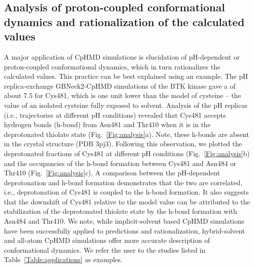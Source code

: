 \subsection{Analysis of proton-coupled conformational dynamics and rationalization of the calculated {\pka} values}
A major application of 
CpHMD simulations is 
elucidation of pH-dependent or proton-coupled conformational dynamics, which 
in turn rationalizes the calculated {\pka} values. 
This practice can be best explained using an example. 
The pH replica-exchange GBNeck2-CpHMD simulations 
of the BTK kinase
\cite{Liu_Shen_2021_J.Med.Chem.}
gave a {\pka} of about 7.5 for Cys481,
which is one unit lower than the 
model {\pka} of cysteine -- the {\pka} value of an isolated cysteine fully exposed to solvent.
Analysis of the pH replicas (i.e., trajectories at different pH conditions) revealed that Cys481 accepts hydrogen bonds (h-bond) from 
Asn481 and Thr410 when it is in the deprotonated 
thiolate state (Fig.~\ref{Fig:analysis}a).
Note, these h-bonds are absent in the crystal structure (PDB 3pj3).
Following this observation, we plotted the deprotonated fractions of Cys481 at different pH conditions (Fig.~\ref{Fig:analysis}b)
and the occupancies of the h-bond formation 
between Cys481 and Asn484 or Thr410
(Fig.~\ref{Fig:analysis}c).
A comparison between the pH-dependent deprotonation
and h-bond formation demonstrates that the two are correlated, i.e., deprotonation of Cys481 is coupled to the h-bond formation.
It also suggests that the {\pka} downshift of Cys481 relative to the model value
can be attributed to the stabilization of the deprotonated thiolate state by the h-bond formation with Asn484 and Thr410.
We note, while implicit-solvent based CpHMD simulations have been successfully applied to {\pka} predictions and rationalization, hybrid-solvent and all-atom CpHMD simulations offer more accurate description of conformational dynamics.
We refer the user to the studies listed in Table~\ref{Table:applications} as examples.  


